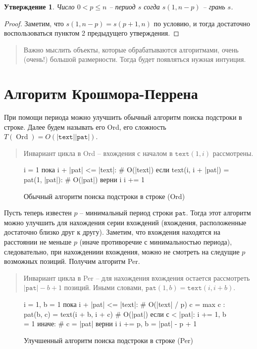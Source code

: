 \documentclass[10pt]{book}
\theoremstyle{plain}
\newtheorem{stm}{Утверждение}[section]
\newcommand{\textm}{\texttt{text}}
\newcommand{\patm}{\texttt{pat}}
\newcommand{\algm}[1]{\operatorname{#1}}
\newenvironment{figurem}[1][]
  {\begin{figure}[p]
  \caption{#1}
  \centering
  }
  {
  \end{figure}
  }
\begin{document}
\begin{stm}
  Число $0 < p \le n$ -- период $s$ согда $s(1, n-p)$ -- грань $s$.
\end{stm}
\begin{proof}
  Заметим, что $s(1, n-p) = s(p + 1, n)$ по условию, и тогда достаточно
  воспользоваться пунктом 2 предыдущего утверждения.
\end{proof}

\begin{quote}
  Важно мыслить объекты, которые обрабатываются алгоритмами, очень (очень!)
  большой размерности. Тогда будет появляться нужная интуиция.
\end{quote}

\section{Алгоритм Крошмора-Перрена}

При помощи периода можно улучшить обычный алгоритм поиска подстроки в строке.
Далее будем называть его Ord, его сложность
$T(\algm{Ord}) = O(|\textm||\patm|)$.

\begin{quote}
  Инвариант цикла в Ord -- вхождения с началом в $\textm(1, i)$ рассмотрены.
\end{quote}

\begin{figurem}[Обычный алгоритм поиска подстроки в строке (Ord)]
\begin{verbm}
  i = 1
  пока i + |pat| <= |text|:  # O(|text|)
    если text(i, i + |pat|) = pat(1, |pat|):  # O(|pat|)
      верни i
    i += 1
\end{verbm}
\end{figurem}

Пусть теперь известен $p$ -- минимальный период строки $\patm$. Тогда этот
алгоритм можно улучшить для нахождения серии вхождений
(вхождения, расположенные достаточно близко друг к другу). Заметим, что
вхождения находятся на расстоянии не меньше $p$ (иначе противоречие с 
минимальностью периода), следовательно, при
нахождениии вхождения, можно не смотреть на следущие $p$ возможных позиций.
Получим алгоритм Per.
\begin{quote}
  Инвариант цикла в Per -- для нахождения вхождения 
  остается рассмотреть $|\patm| - b + 1$ позиций. Иными словами,
  $\patm(1,b) = \textm(i, i+b)$.
\end{quote}

\begin{figurem}[Улучшенный алгоритм поиска подстроки в строке (Per)]
\begin{verbm}
  i = 1, b = 1
  пока i + |pat| <= |text|:  # O(|text| / p)
    c = max { c : pat(b, c) = text(i + b, i + c) }  # O(|pat|)
    если с < |pat|:
      i += 1, b = 1
    иначе:  # c = |pat|
      верни i
      i += p, b = |pat| - p + 1
\end{verbm}
\end{figurem}
\end{document}
